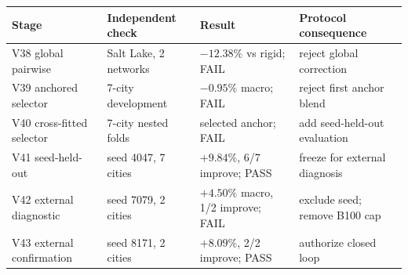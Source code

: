 \begin{tabular}{llll}
\toprule
Stage & Independent check & Result & Protocol consequence \\
\midrule
V38 global pairwise & Salt Lake, 2 networks & $-12.38\%$ vs rigid; FAIL & reject global correction \\
V39 anchored selector & 7-city development & $-0.95\%$ macro; FAIL & reject first anchor blend \\
V40 cross-fitted selector & 7-city nested folds & selected anchor; FAIL & add seed-held-out evaluation \\
V41 seed-held-out & seed 4047, 7 cities & $+9.84\%$, 6/7 improve; PASS & freeze for external diagnosis \\
V42 external diagnostic & seed 7079, 2 cities & $+4.50\%$ macro, 1/2 improve; FAIL & exclude seed; remove B100 cap \\
V43 external confirmation & seed 8171, 2 cities & $+8.09\%$, 2/2 improve; PASS & authorize closed loop \\
\bottomrule
\end{tabular}
